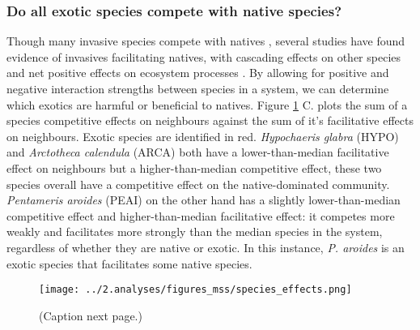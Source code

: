 \documentclass[a4,12pt]{article}
\begin{document}
    \subsubsection*{Do all exotic species compete with native species?}
    Though many invasive species compete with natives \parencite{Naeem2000, Corbin2004, Riley2008, Zheng2015}, several studies have found evidence of invasives facilitating natives, with cascading effects on other species and net positive effects on ecosystem processes \parencite{Rodriguez2006, Ramus2017}. By allowing for positive and negative interaction strengths between species in a system, we can determine which exotics are harmful or beneficial to natives. Figure \ref{fig:species} C. plots the sum of a species competitive effects on neighbours against the sum of it's facilitative effects on neighbours. Exotic species are identified in red. \textit{Hypochaeris glabra} (HYPO) and \textit{Arctotheca calendula} (ARCA) both have a lower-than-median facilitative effect on neighbours but a higher-than-median competitive effect, these two species overall have a competitive effect on the native-dominated community. \textit{Pentameris aroides} (PEAI) on the other hand has a slightly lower-than-median competitive effect and higher-than-median facilitative effect: it competes more weakly and facilitates more strongly than the median species in the system, regardless of whether they are native or exotic. In this instance, \textit{P. aroides} is an exotic species that facilitates some native species.




    \begin{figure}[H]
        \begin{centering}
        \texttt{[image: ../2.analyses/figures\_mss/species\_effects.png]}
        \caption{(Caption next page.)}
        \label{fig:species}
        \end{centering}
    \end{figure} 
\end{document}
